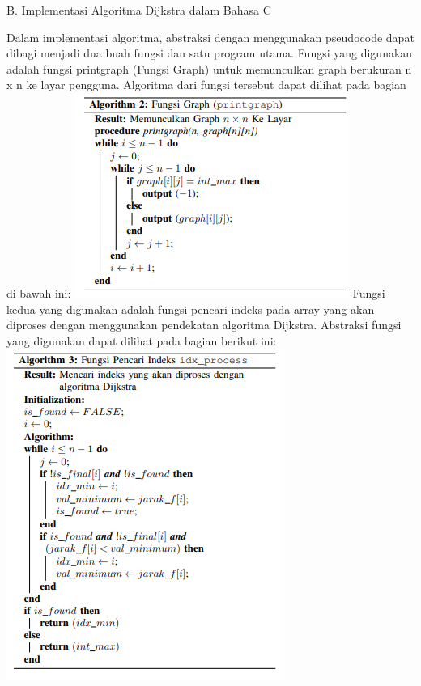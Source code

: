 \documentclass[conference]{IEEEtran}
\begin{document}
B. Implementasi Algoritma Dijkstra dalam Bahasa C\vspace{0.5cm}

Dalam implementasi algoritma, abstraksi dengan menggunakan pseudocode dapat dibagi menjadi dua buah fungsi dan
satu program utama. Fungsi yang digunakan adalah fungsi
printgraph (Fungsi Graph) untuk memunculkan graph berukuran n x n ke layar pengguna. Algoritma dari fungsi tersebut
dapat dilihat pada bagian di bawah ini:\vspace{0.5cm}
\includegraphics[scale=0.76]{tugas0524.jpg}\vspace{0.5cm}
Fungsi kedua yang digunakan adalah fungsi pencari indeks
pada array yang akan diproses dengan menggunakan pendekatan algoritma Dijkstra. Abstraksi fungsi yang digunakan
dapat dilihat pada bagian berikut ini:\vspace{0.5cm}
\includegraphics[scale=0.75]{tugas0525.jpg}\vspace{0.5cm}
\end{document}
